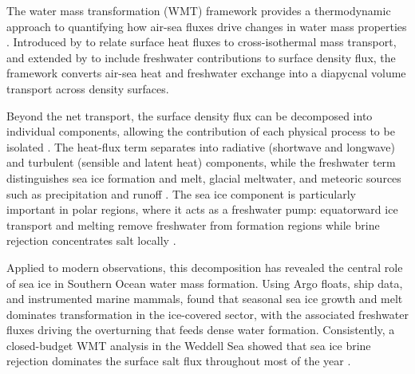 \documentclass[draft]{agujournal2025}
\begin{document}




The water mass transformation (WMT) framework provides a thermodynamic approach to quantifying how air-sea fluxes drive changes in water mass properties \cite{Walin1982,Groeskamp2019,drake2025water}. Introduced by  to relate surface heat fluxes to cross-isothermal mass transport, and extended by  to include freshwater contributions to surface density flux, the framework converts air-sea heat and freshwater exchange into a diapycnal volume transport across density surfaces.

Beyond the net transport, the surface density flux can be decomposed into individual components, allowing the contribution of each physical process to be isolated \cite{Iudicone2008a,Iudicone2008b}. The heat-flux term separates into radiative (shortwave and longwave) and turbulent (sensible and latent heat) components, while the freshwater term distinguishes sea ice formation and melt, glacial meltwater, and meteoric sources such as precipitation and runoff \cite{Abernathey2016,Bailey2023}. The sea ice component is particularly important in polar regions, where it acts as a freshwater pump: equatorward ice transport and melting remove freshwater from formation regions while brine rejection concentrates salt locally \cite{Abernathey2016}.

Applied to modern observations, this decomposition has revealed the central role of sea ice in Southern Ocean water mass formation. Using Argo floats, ship data, and instrumented marine mammals,  found that seasonal sea ice growth and melt dominates transformation in the ice-covered sector, with the associated freshwater fluxes driving the overturning that feeds dense water formation. Consistently, a closed-budget WMT analysis in the Weddell Sea showed that sea ice brine rejection dominates the surface salt flux throughout most of the year \cite{Bailey2023}.
\end{document}
